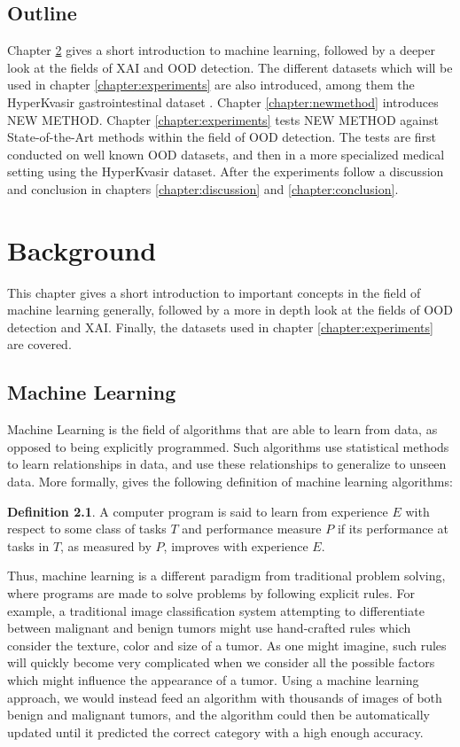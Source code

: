 \documentclass[UKenglish]{uiomasterthesis} %
\theoremstyle{definition}
\newtheorem*{definition}{Definition}
\begin{document}
\section{Outline}

Chapter \ref{chapter:background} gives a short introduction to machine learning, followed by a deeper look at the fields of XAI and OOD detection. The different datasets which will be used in chapter \ref{chapter:experiments} are also introduced, among them the HyperKvasir gastrointestinal dataset \cite{hyperkvasir}. Chapter \ref{chapter:newmethod} introduces NEW METHOD. Chapter \ref{chapter:experiments} tests NEW METHOD against State-of-the-Art methods within the field of OOD detection. The tests are first conducted on well known OOD datasets, and then in a more specialized medical setting using the HyperKvasir dataset. After the experiments follow a discussion and conclusion in chapters \ref{chapter:discussion} and \ref{chapter:conclusion}.

\chapter{Background} \label{chapter:background}

This chapter gives a short introduction to important concepts in the field of machine learning generally, followed by a more in depth look at the fields of OOD detection and XAI. Finally, the datasets used in chapter \ref{chapter:experiments} are covered.

\section{Machine Learning}

Machine Learning is the field of algorithms that are able to learn from data, as opposed to being explicitly programmed. Such algorithms use statistical methods to learn relationships in data, and use these relationships to generalize to unseen data. More formally, \cite{mitchell} gives the following definition of machine learning algorithms:

\begin{definition}
A computer program is said to learn from experience $E$ with respect to some class of tasks $T$ and performance measure $P$ if its performance at tasks in $T$, as measured by $P$, improves with experience $E$.
\end{definition}

Thus, machine learning is a different paradigm from traditional problem solving, where programs are made to solve problems by following explicit rules. For example, a traditional image classification system attempting to differentiate between malignant and benign tumors might use hand-crafted rules which consider the texture, color and size of a tumor. As one might imagine, such rules will quickly become very complicated when we consider all the possible factors which might influence the appearance of a tumor. Using a machine learning approach, we would instead feed an algorithm with thousands of images of both benign and malignant tumors, and the algorithm could then be automatically updated until it predicted the correct category with a high enough accuracy.
\end{document}
